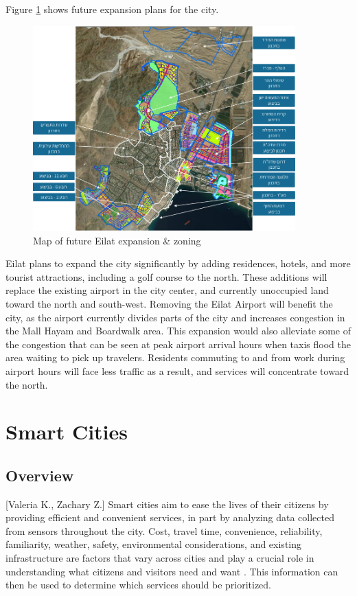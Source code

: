 \documentclass[12pt]{article}                               %
\begin{document}
Figure \ref{img:eilat_expansion} shows future expansion plans for the city.

\begin{figure}[H]
    \centering
    \includegraphics[width=0.9\textwidth]{images/eilat_zoning_future.png}
    \caption{Map of future Eilat expansion \& zoning}
    \label{img:eilat_expansion}
\end{figure}

Eilat plans to expand the city significantly by adding residences, hotels, and more tourist attractions, including a golf course to the north. These additions will replace the existing airport in the city center, and currently unoccupied land toward the north and south-west. Removing the Eilat Airport will benefit the city, as the airport currently divides parts of the city and increases congestion in the Mall Hayam and Boardwalk area. This expansion would also alleviate some of the congestion that can be seen at peak airport arrival hours when taxis flood the area waiting to pick up travelers. Residents commuting to and from work during airport hours will face less traffic as a result, and services will concentrate toward the north. 

\newpage
\section{Smart Cities}\label{sec:smart_cities}
\subsection{Overview}[Valeria K., Zachary Z.]
Smart cities aim  to ease the lives of their citizens by providing efficient and convenient services, in part by analyzing data collected from sensors throughout the city. Cost, travel time, convenience, reliability, familiarity, weather, safety, environmental considerations, and existing infrastructure are factors that vary across cities and play a crucial role in understanding what citizens and visitors need and want \cite{CityofAustin2016}. This information can then be used to determine which services should be prioritized.
\end{document}
